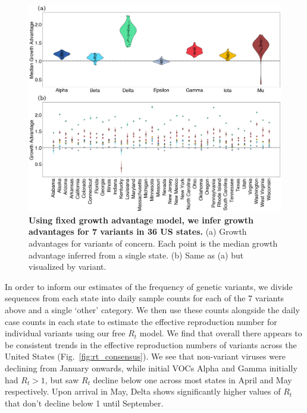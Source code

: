 \documentclass[11pt,oneside,letterpaper]{article}
\begin{document}
\begin{figure}[t]
  \centering
  \includegraphics[width=\linewidth]{figs/growth_advantages.png}
  \caption{\textbf{Using fixed growth advantage model, we infer growth advantages for 7 variants in 36 US states.}
  (a) Growth advantages for variants of concern. Each point is the median growth advantage inferred from a single state.
  (b) Same as (a) but visualized by variant.}
  \label{fig:growth_advantages}
\end{figure}

In order to inform our estimates of the frequency of genetic variants, we divide sequences from each state into daily sample counts for each of the 7 variants above and a single `other' category.
We then use these counts alongside the daily case counts in each state to estimate the effective reproduction number for individual variants using our free $R_{t}$ model.
We find that overall there appears to be consistent trends in the effective reproduction numbers of variants across the United States (Fig.\ \ref{fig:rt_consensus}).
We see that non-variant viruses were declining from January onwards, while initial VOCs Alpha and Gamma initially had $R_t>1$, but saw $R_t$ decline below one across most states in April and May respectively.
Upon arrival in May, Delta shows significantly higher values of $R_t$ that don't decline below 1 until September.
\end{document}
